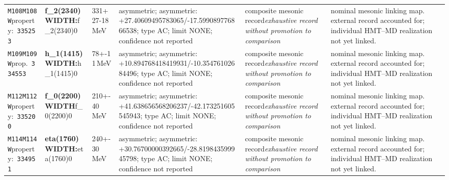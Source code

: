 \begin{landscape}
\begin{longtable}{L{1.85cm}L{4.45cm}L{2.35cm}L{4.05cm}L{3.35cm}L{7.15cm}}
\texttt{M108}\newline \texttt{M108W}\newline property:\ \texttt{335253} & \textbf{f\_\allowbreak{}2(2340) WIDTH:}\newline f\_\allowbreak{}2(2340)0 & 331+27-18\,MeV & asymmetric; asymmetric: +27.40609495783065/-17.599089776866538; type AC; limit NONE; confidence not reported & composite mesonic record\newline \emph{exhaustive record without promotion to comparison} & nominal mesonic linking map. external record accounted for; individual HMT--MD realization not yet linked. \\
\texttt{M109}\newline \texttt{M109W}\newline prop.\ \texttt{334553} & \textbf{h\_\allowbreak{}1(1415) WIDTH:}\newline h\_\allowbreak{}1(1415)0 & 78+-11\,MeV & asymmetric; asymmetric: +10.894768418419931/-10.35476102684496; type AC; limit NONE; confidence not reported & composite mesonic record\newline \emph{exhaustive record without promotion to comparison} & nominal mesonic linking map. external record accounted for; individual HMT--MD realization not yet linked. \\
\texttt{M112}\newline \texttt{M112W}\newline property:\ \texttt{335200} & \textbf{f\_\allowbreak{}0(2200) WIDTH}\newline f\_\allowbreak{}0(2200)0 & 210+-40\,MeV & asymmetric; asymmetric: +41.638656568206237/-42.173251605545943; type AC; limit NONE; confidence not reported & composite mesonic record\newline \emph{exhaustive record without promotion to comparison} & nominal mesonic linking map. external record accounted for; individual HMT--MD realization not yet linked. \\
\texttt{M114}\newline \texttt{M114W}\newline property:\ \texttt{334951} & \textbf{eta(1760) WIDTH:}\newline eta(1760)0 & 240+-30\,MeV & asymmetric; asymmetric: +30.76700000392665/-28.819843599945798; type AC; limit NONE; confidence not reported & composite mesonic record\newline \emph{exhaustive record without promotion to comparison} & nominal mesonic linking map. external record accounted for; individual HMT--MD realization not yet linked. \\

\end{longtable}
\end{landscape}
